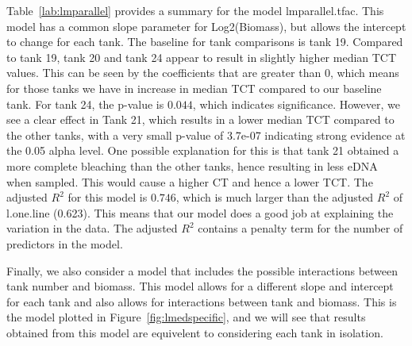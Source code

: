 Table~\ref{lab:lmparallel} provides a summary for the model  lmparallel.tfac. This model has a common slope parameter for Log2(Biomass), but allows the intercept to change for each tank. The baseline for tank comparisons is tank 19. Compared to tank 19, tank 20 and tank 24 appear to result in slightly higher median TCT values. This can be seen by the coefficients that are greater than 0, which means for those tanks we have in increase in median TCT compared to our baseline tank. For tank 24, the p-value is $0.044$, which indicates significance. However, we see a clear effect in Tank 21, which results in a lower median TCT compared to the other tanks, with a very small p-value of 3.7e-07 indicating strong evidence at the 0.05 alpha level. One possible explanation for this is that tank 21 obtained a more complete bleaching than the other tanks, hence resulting in less eDNA when sampled. This would cause a higher CT and hence a lower TCT.  The adjusted $R^{2}$ for this model is $0.746$, which is much larger than the adjusted $R^{2}$ of l.one.line (0.623). This means that our model does a good job at explaining the variation in the data. The adjusted $R^{2}$ contains a penalty term for the number of predictors in the model. 





\newpage

Finally, we also consider a model that includes the possible interactions between tank number and biomass.  This model allows for a different slope and intercept for each tank and also allows for interactions between tank and biomass. This is the model plotted in Figure~\ref{fig:lmedspecific}, and we will see that results obtained from this model are equivelent to considering each tank in isolation.

